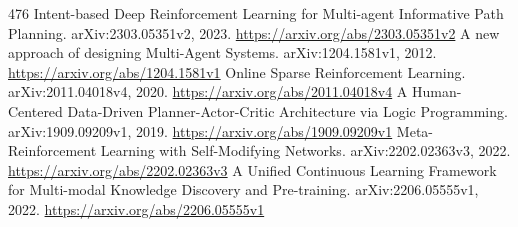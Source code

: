 \documentclass[11pt]{article}
\begin{document}
\begin{thebibliography}{476}
 Intent-based Deep Reinforcement Learning for Multi-agent Informative Path Planning. arXiv:2303.05351v2, 2023. \url{https://arxiv.org/abs/2303.05351v2}
 A new approach of designing Multi-Agent Systems. arXiv:1204.1581v1, 2012. \url{https://arxiv.org/abs/1204.1581v1}
 Online Sparse Reinforcement Learning. arXiv:2011.04018v4, 2020. \url{https://arxiv.org/abs/2011.04018v4}
 A Human-Centered Data-Driven Planner-Actor-Critic Architecture via Logic Programming. arXiv:1909.09209v1, 2019. \url{https://arxiv.org/abs/1909.09209v1}
 Meta-Reinforcement Learning with Self-Modifying Networks. arXiv:2202.02363v3, 2022. \url{https://arxiv.org/abs/2202.02363v3}
 A Unified Continuous Learning Framework for Multi-modal Knowledge Discovery and Pre-training. arXiv:2206.05555v1, 2022. \url{https://arxiv.org/abs/2206.05555v1}
\end{thebibliography}
\end{document}
